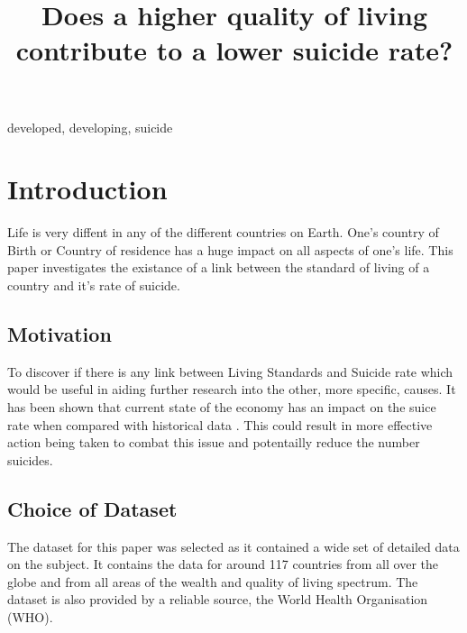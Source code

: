 \documentclass[conference]{IEEEtran}
\begin{document}
\title{Does a higher quality of living contribute to a lower suicide rate?\\
}

\author{
}

\maketitle

\begin{abstract}

\end{abstract}

\begin{IEEEkeywords}
developed, developing, suicide
\end{IEEEkeywords}

\section{Introduction}
Life is very diffent in any of the different countries on Earth. One's country of Birth or Country of residence
has a huge impact on all aspects of one's life. This paper investigates the existance of a link between
the standard of living of a country and it's rate of suicide.

\subsection{Motivation}
To discover if there is any link between Living Standards and Suicide rate which would be useful in aiding further
research into the other, more specific, causes. It has been shown that current state of the economy
has an impact on the suice rate when compared with historical data \cite{Suicides_2008-10}. This could result in more effective action being taken to combat this
issue and potentailly reduce the number suicides.

\subsection{Choice of Dataset}
The dataset for this paper was selected as it contained a wide set of detailed data on the subject.
It contains the data for around 117 countries from all over the globe and from all areas of the wealth and quality of living spectrum.
The dataset is also provided by a reliable source, the World Health Organisation (WHO).
\end{document}
